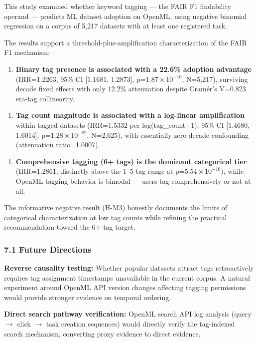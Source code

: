 
This study examined whether keyword tagging --- the FAIR F1 findability operand --- predicts ML dataset adoption on OpenML, using negative binomial regression on a corpus of 5,217 datasets with at least one registered task.

The results support a threshold-plus-amplification characterization of the FAIR F1 mechanism:

\begin{enumerate}
\item \textbf{Binary tag presence is associated with a 22.6\% adoption advantage} (IRR=1.2263, 95\% CI [1.1681, 1.2873], p=1.$87\times 10^{-16}$, N=5,217), surviving decade fixed effects with only 12.2\% attenuation despite Cramér's V=0.823 era-tag collinearity.
\end{enumerate}

\begin{enumerate}
\item \textbf{Tag count magnitude is associated with a log-linear amplification} within tagged datasets (IRR=1.5332 per log(tag\_count+1), 95\% CI [1.4680, 1.6014], p=1.$28\times 10^{-82}$, N=2,625), with essentially zero decade confounding (attenuation ratio=1.0007).
\end{enumerate}

\begin{enumerate}
\item \textbf{Comprehensive tagging (6+ tags) is the dominant categorical tier} (IRR=1.2861, distinctly above the 1--5 tag range at p=5.$54\times 10^{-10})$, while OpenML tagging behavior is bimodal --- users tag comprehensively or not at all.
\end{enumerate}

The informative negative result (H-M3) honestly documents the limits of categorical characterization at low tag counts while refining the practical recommendation toward the 6+ tag target.

\subsubsection{7.1 Future Directions}

\textbf{Reverse causality testing:} Whether popular datasets attract tags retroactively requires tag assignment timestamps unavailable in the current corpus. A natural experiment around OpenML API version changes affecting tagging permissions would provide stronger evidence on temporal ordering.

\textbf{Direct search pathway verification:} OpenML search API log analysis (query $\rightarrow$ click $\rightarrow$ task creation sequences) would directly verify the tag-indexed search mechanism, converting proxy evidence to direct evidence.

